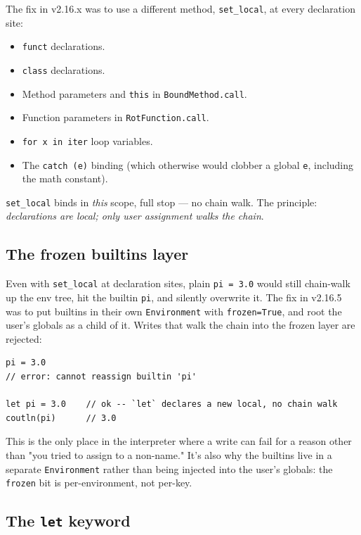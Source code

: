\documentclass[11pt]{article}
\begin{document}
The fix in v2.16.x was to use a different method, \texttt{set\_local}, at every declaration site:

\begin{itemize}[leftmargin=*,nosep,topsep=4pt,partopsep=0pt]
  \item \texttt{funct} declarations.
  \item \texttt{class} declarations.
  \item Method parameters and \texttt{this} in \texttt{BoundMethod.call}.
  \item Function parameters in \texttt{RotFunction.call}.
  \item \texttt{for x in iter} loop variables.
  \item The \texttt{catch (e)} binding (which otherwise would clobber a global \texttt{e}, including the math constant).
\end{itemize}

\texttt{set\_local} binds in \emph{this} scope, full stop --- no chain walk. The principle: \emph{declarations are local; only user assignment walks the chain}.

\subsection{The frozen builtins layer}

Even with \texttt{set\_local} at declaration sites, plain \texttt{pi = 3.0} would still chain-walk up the env tree, hit the builtin \texttt{pi}, and silently overwrite it. The fix in v2.16.5 was to put builtins in their own \texttt{Environment} with \texttt{frozen=True}, and root the user's globals as a child of it. Writes that walk the chain into the frozen layer are rejected:

\begin{lstlisting}[style=rotstyle]
pi = 3.0
// error: cannot reassign builtin 'pi'

let pi = 3.0    // ok -- `let` declares a new local, no chain walk
coutln(pi)      // 3.0
\end{lstlisting}

This is the only place in the interpreter where a write can fail for a reason other than "you tried to assign to a non-name." It's also why the builtins live in a separate \texttt{Environment} rather than being injected into the user's globals: the \texttt{frozen} bit is per-environment, not per-key.

\subsection{The \texttt{let} keyword}
\end{document}
